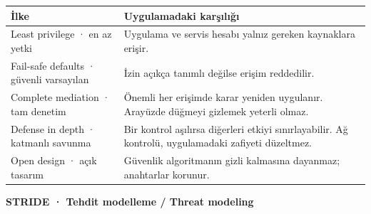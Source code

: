 \documentclass[11pt,a4paper]{article}
\newcommand{\AltBaslik}[1]{\par\vspace{3pt}\textbf{#1}\par\nobreak}
\begin{document}
\begingroup\small\begin{tabularx}{\linewidth}{@{}LY@{}}\toprule
İlke & Uygulamadaki karşılığı\\\midrule
Least privilege · en az yetki & Uygulama ve servis hesabı yalnız gereken kaynaklara erişir.\\[2pt]
Fail-safe defaults · güvenli varsayılan & İzin açıkça tanımlı değilse erişim reddedilir.\\[2pt]
Complete mediation · tam denetim & Önemli her erişimde karar yeniden uygulanır. Arayüzde düğmeyi gizlemek yeterli olmaz.\\[2pt]
Defense in depth · katmanlı savunma & Bir kontrol aşılırsa diğerleri etkiyi sınırlayabilir. Ağ kontrolü, uygulamadaki zafiyeti düzeltmez.\\[2pt]
Open design · açık tasarım & Güvenlik algoritmanın gizli kalmasına dayanmaz; anahtarlar korunur.\\[2pt]
\bottomrule\end{tabularx}\endgroup\par
\AltBaslik{STRIDE · Tehdit modelleme / Threat modeling}
\end{document}
